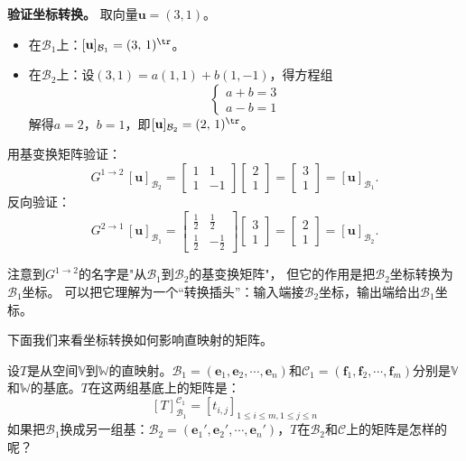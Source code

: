 \documentclass[12pt,UTF8,fontset=none]{ctexbook}
\begin{document}
\begin{ex}
\textbf{验证坐标转换。}
取向量$\mathbf{u} = (3,1)$。
\begin{itemize}
\item 在$\mathcal{B}_1$上：$[\mathbf{u}]_{\mathcal{B}_1} = (3,\,1)^{\tr}$。
\item 在$\mathcal{B}_2$上：设$(3,1) = a(1,1) + b(1,-1)$，得方程组
$$\begin{cases} a + b = 3 \\ a - b = 1 \end{cases}$$
解得$a = 2$，$b = 1$，即$[\mathbf{u}]_{\mathcal{B}_2} = (2,\,1)^{\tr}$。
\end{itemize}
用基变换矩阵验证：
$$G^{1\rightarrow 2}\,[\mathbf{u}]_{\mathcal{B}_2} = \begin{bmatrix} 1 & 1 \\ 1 & -1 \end{bmatrix}\begin{bmatrix} 2 \\ 1 \end{bmatrix} = \begin{bmatrix} 3 \\ 1 \end{bmatrix} = [\mathbf{u}]_{\mathcal{B}_1}. $$
反向验证：
$$G^{2\rightarrow 1}\,[\mathbf{u}]_{\mathcal{B}_1} = \begin{bmatrix} \frac{1}{2} & \frac{1}{2} \\[2pt] \frac{1}{2} & -\frac{1}{2} \end{bmatrix}\begin{bmatrix} 3 \\ 1 \end{bmatrix} = \begin{bmatrix} 2 \\ 1 \end{bmatrix} = [\mathbf{u}]_{\mathcal{B}_2}. $$
\end{ex}

注意到$G^{1\rightarrow 2}$的名字是"从$\mathcal{B}_1$到$\mathcal{B}_2$的基变换矩阵"，
但它的作用是把$\mathcal{B}_2$坐标转换为$\mathcal{B}_1$坐标。
可以把它理解为一个“转换插头”：输入端接$\mathcal{B}_2$坐标，输出端给出$\mathcal{B}_1$坐标。

下面我们来看坐标转换如何影响直映射的矩阵。

设$T$是从空间$\mathbb{V}$到$\mathbb{W}$的直映射。$\mathcal{B}_1 = (\mathbf{e}_1, \mathbf{e}_2, \cdots, \mathbf{e}_n)$和$\mathcal{C}_1 = (\mathbf{f}_1, \mathbf{f}_2, \cdots, \mathbf{f}_m)$分别是$\mathbb{V}$和$\mathbb{W}$的基底。$T$在这两组基底上的矩阵是：
$$[T]_{\mathcal{B}_1}^{\mathcal{C}_1} = [t_{i, j}]_{1\leqslant i \leqslant m, 1\leqslant j \leqslant n}$$
如果把$\mathcal{B}_1$换成另一组基：$\mathcal{B}_2 = (\mathbf{e}_1', \mathbf{e}_2', \cdots, \mathbf{e}_n')$，$T$在$\mathcal{B}_2$和$\mathcal{C}$上的矩阵是怎样的呢？
\end{document}
